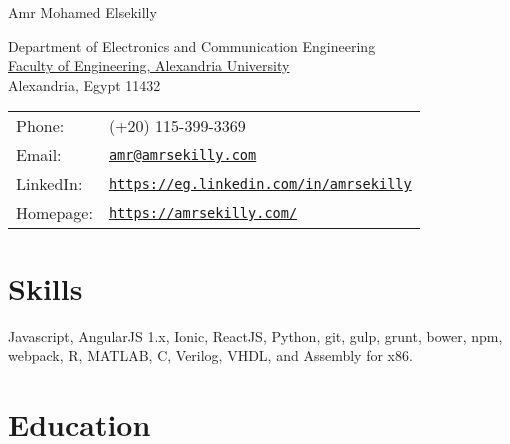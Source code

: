 \documentclass[letterpaper]{article}
\def\name{Amr Mohamed Elsekilly}
\renewenvironment{itemize}{
  \begin{list}{}{
    \setlength{\leftmargin}{1.5em}
  }
}{
  \end{list}
}
\begin{document}
{\huge \name}


\vspace{0.25in}

\begin{minipage}{0.45\linewidth}
  Department of Electronics and Communication Engineering \\
  \href{http://eng.alexu.edu.eg/}{Faculty of Engineering, Alexandria University} \\
  Alexandria, Egypt 11432
\end{minipage}
\begin{minipage}{0.45\linewidth}
  \begin{tabular}{ll}
    Phone: & (+20) 115-399-3369 \\
    Email: & \href{mailto:amr@amrsekilly.com}{\tt amr@amrsekilly.com} \\
    LinkedIn: & \href{https://eg.linkedin.com/in/amrsekilly}{\tt https://eg.linkedin.com/in/amrsekilly} \\
    Homepage: & \href{https://amrsekilly.com/}{\tt https://amrsekilly.com/} \\
  \end{tabular}
\end{minipage}


%


\section*{Skills}

\begin{itemize}
  \item Javascript, AngularJS 1.x, Ionic, ReactJS, Python, git, gulp, grunt, bower, npm, webpack, R, MATLAB, C, Verilog, VHDL, and Assembly for x86.
\end{itemize}

\section*{Education}
\end{document}
